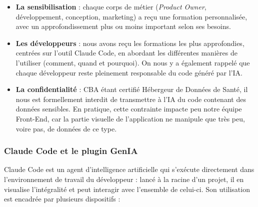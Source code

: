 \documentclass{article}
\begin{document}
\begin{itemize}
    \item \textbf{La sensibilisation} : chaque corps de métier (\textit{Product Owner}, développement, conception, marketing) a reçu une formation personnalisée, avec un approfondissement plus ou moins important selon ses besoins.

    \item \textbf{Les développeurs} : nous avons reçu les formations les plus approfondies, centrées sur l'outil Claude Code, en abordant les différentes manières de l'utiliser (comment, quand et pourquoi). On nous y a également rappelé que chaque développeur reste pleinement responsable du code généré par l'IA.

    \item \textbf{La confidentialité} : CBA étant certifié Hébergeur de Données de Santé, il nous est formellement interdit de transmettre à l'IA du code contenant des données sensibles. En pratique, cette contrainte impacte peu notre équipe Front-End, car la partie visuelle de l'application ne manipule que très peu, voire pas, de données de ce type.
\end{itemize}

\subsubsection{Claude Code et le plugin GenIA}

Claude Code est un agent d'intelligence artificielle qui s'exécute directement dans l'environnement de travail du développeur : lancé à la racine d'un projet, il en visualise l'intégralité et peut interagir avec l'ensemble de celui-ci. Son utilisation est encadrée par plusieurs dispositifs :
\end{document}
